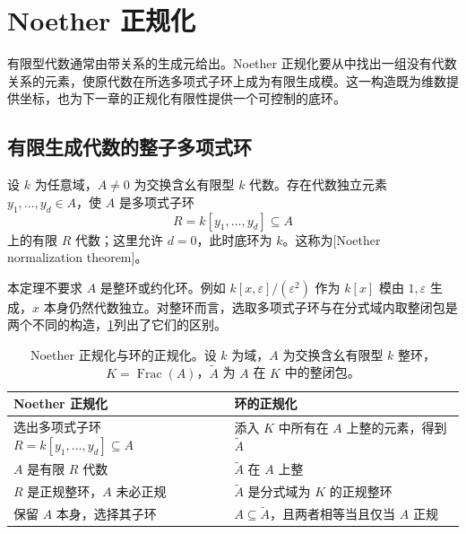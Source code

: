 
\section{Noether 正规化}\label{b3:sec:0504}

有限型代数通常由带关系的生成元给出。Noether 正规化要从中找出一组没有代数关系的元素，使原代数在所选多项式子环上成为有限生成模。这一构造既为维数提供坐标，也为下一章的正规化有限性提供一个可控制的底环。

\subsection{有限生成代数的整子多项式环}\label{b3:subsec:0504:01}

\begin{theorem}\label{b3:thm:noether-normalization}
	设 \(k\) 为任意域，\(A\ne0\) 为交换含幺有限型 \(k\) 代数。存在代数独立元素 \(y_1,\ldots,y_d\in A\)，使 \(A\) 是多项式子环
	\[
		R=k[y_1,\ldots,y_d]\subseteq A
	\]
	上的有限 \(R\) 代数；这里允许 \(d=0\)，此时底环为 \(k\)。这称为[Noether normalization theorem]。
\end{theorem}

本定理不要求 \(A\) 是整环或约化环。例如 \(k[x,\varepsilon]/(\varepsilon^2)\) 作为 \(k[x]\) 模由 \(1,\varepsilon\) 生成，\(x\) 本身仍然代数独立。对整环而言，选取多项式子环与在分式域内取整闭包是两个不同的构造，\cref{b3:tab:two-normalizations}列出了它们的区别。

\begin{table}[htbp]
	\centering
	\caption[Noether 正规化与环的正规化]{Noether 正规化与环的正规化。设 \(k\) 为域，\(A\) 为交换含幺有限型 \(k\) 整环，\(K=\operatorname{Frac}(A)\)，\(\widetilde A\) 为 \(A\) 在 \(K\) 中的整闭包。}
	\label{b3:tab:two-normalizations}
	\begin{tabularx}{\textwidth}{@{}>{\raggedright\arraybackslash}X>{\raggedright\arraybackslash}X@{}}
		\toprule
		Noether 正规化 & 环的正规化\\
		\midrule
		选出多项式子环 \(R=k[y_1,\ldots,y_d]\subseteq A\) & 添入 \(K\) 中所有在 \(A\) 上整的元素，得到 \(\widetilde A\)\\
		\(A\) 是有限 \(R\) 代数 & \(\widetilde A\) 在 \(A\) 上整\\
		\(R\) 是正规整环，\(A\) 未必正规 & \(\widetilde A\) 是分式域为 \(K\) 的正规整环\\
		保留 \(A\) 本身，选择其子环 & \(A\subseteq\widetilde A\)，且两者相等当且仅当 \(A\) 正规\\
		\bottomrule
	\end{tabularx}
\end{table}

